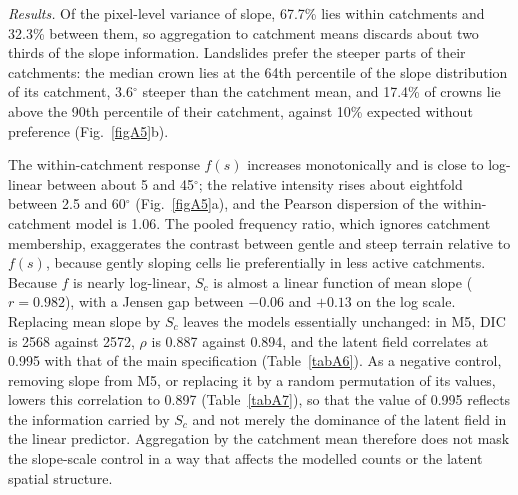 \documentclass[journal abbreviation, manuscript]{copernicus}
\begin{document}
\textit{Results.} Of the pixel-level variance of slope, 67.7\% lies within catchments and 32.3\% between them, so aggregation to catchment means discards about two thirds of the slope information. Landslides prefer the steeper parts of their catchments: the median crown lies at the 64th percentile of the slope distribution of its catchment, 3.6$^{\circ}$ steeper than the catchment mean, and 17.4\% of crowns lie above the 90th percentile of their catchment, against 10\% expected without preference (Fig.~\ref{figA5}b).

The within-catchment response $f(s)$ increases monotonically and is close to log-linear between about 5 and 45$^{\circ}$; the relative intensity rises about eightfold between 2.5 and 60$^{\circ}$ (Fig.~\ref{figA5}a), and the Pearson dispersion of the within-catchment model is 1.06. The pooled frequency ratio, which ignores catchment membership, exaggerates the contrast between gentle and steep terrain relative to $f(s)$, because gently sloping cells lie preferentially in less active catchments. Because $f$ is nearly log-linear, $S_c$ is almost a linear function of mean slope ($r = 0.982$), with a Jensen gap between $-0.06$ and $+0.13$ on the log scale. Replacing mean slope by $S_c$ leaves the models essentially unchanged: in M5, DIC is 2568 against 2572, $\rho$ is 0.887 against 0.894, and the latent field correlates at 0.995 with that of the main specification (Table~\ref{tabA6}). As a negative control, removing slope from M5, or replacing it by a random permutation of its values, lowers this correlation to 0.897 (Table~\ref{tabA7}), so that the value of 0.995 reflects the information carried by $S_c$ and not merely the dominance of the latent field in the linear predictor. Aggregation by the catchment mean therefore does not mask the slope-scale control in a way that affects the modelled counts or the latent spatial structure.
\end{document}
